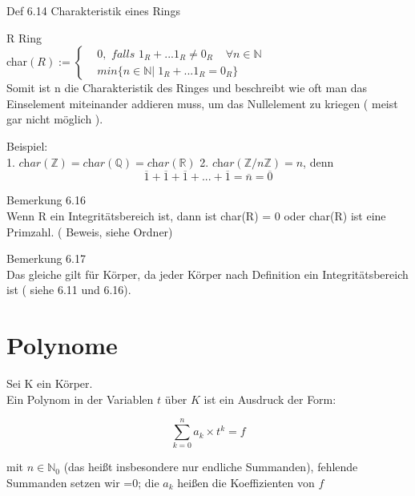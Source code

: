 \documentclass[headsepline,12pt,a4paper]{scrartcl}
\begin{document}
\begin{center}
\item[ Def 6.14 Charakteristik eines Rings ]
\end{center}
\item R Ring \\

char$(R):=  \begin{cases}
& 0, \textit{ falls } 1_R +... 1_R \neq 0_R \; \; \; \; \forall n \in \mathbb{N} \\
& min \{n\in \mathbb{N} | \; 1_R + ... 1_R = 0_R \} 
\end{cases}$ \\

Somit ist n die Charakteristik des Ringes und beschreibt wie oft man das Einselement miteinander addieren muss, um das Nullelement zu kriegen ( meist gar nicht möglich ).


\item Beispiel: \\
1. $\textit{char}(\mathbb{Z}) = \textit{char}(\mathbb{Q}) = \textit{char}(\mathbb{R})$
2. $\textit{char}(\mathbb{Z}/n \mathbb{Z}) = n $, denn \\
$$ \overline{1} + \overline{1} + \overline{1} + ... +  \overline{1} = \overline{n} = \overline{0} $$

\item Bemerkung 6.16 \\

Wenn R ein Integritätsbereich ist, dann ist char(R) = 0 oder char(R) ist eine Primzahl. ( Beweis, siehe Ordner)

\item Bemerkung 6.17 \\

Das gleiche gilt für Körper, da jeder Körper nach Definition ein Integritätsbereich ist ( siehe 6.11 und 6.16).

\newpage

\section*{Polynome}

\item Sei K ein Körper. \\
Ein Polynom in der Variablen $t$ über $K$ ist ein Ausdruck der Form: 

$$ \sum\limits_{k=0}^n a_k \times t^k = f $$

mit $n \in \mathbb{N}_0$ (das heißt insbesondere nur endliche Summanden), fehlende Summanden setzen wir =0; die $a_k$ heißen die Koeffizienten von $f$  \\
\end{document}
